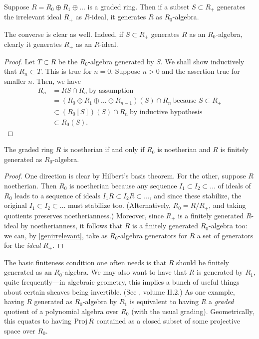 \begin{proposition} \label{genirrelevant}
Suppose $R = R_0 \oplus R_1 \oplus \dots$ is  a graded ring. Then if a subset
$S \subset R_+$ generates the irrelevant ideal $R_+$ as $R$-ideal, it generates $R$ as $R_0$-algebra.
\end{proposition} 
The converse is clear as well. 
Indeed, if $S \subset R_+$ generates $R$ as an $R_0$-algebra, clearly it
generates $R_+$ as an $R$-ideal. 
\begin{proof} 
Let $T \subset R$ be the $R_0$-algebra generated by $S$. We shall show
inductively that $R_n \subset T$. This is true for $n=0$. Suppose $n>0$ and the
assertion true for smaller $n$. Then, we have
\begin{align*}
R_n  & = RS \cap R_n   \ \text{by assumption} \\
& = (R_0 \oplus R_1 \oplus \dots \oplus R_{n-1})(S) \cap R_n \ \text{because $S
\subset R_+$} \\
& \subset (R_0[S]) (S) \cap R_n \ \text{by inductive hypothesis} \\
& \subset R_0(S). \end{align*}
\end{proof} 
\begin{theorem} \label{gradednoetherian}
The graded ring $R$ is noetherian if and only if $R_0$ is noetherian and $R$ is finitely
generated as $R_0$-algebra.
\end{theorem} 
\begin{proof} 
One direction is clear by Hilbert's basis theorem. For the other, suppose $R$
noetherian. Then $R_0$ is noetherian because any sequence $I_1 \subset I_2
\subset \dots$ of ideals of $R_0$ leads to a sequence of ideals $I_1 R \subset
I_2 R \subset \dots$, and since these stabilize, the original $I_1 \subset I_2
\subset \dots$ must stabilize too. (Alternatively, $R_0 = R/R_+$, and taking
quotients preserves noetherianness.)
Moreover, since $R_+$ is a finitely generated
$R$-ideal by noetherianness, it follows that $R$ is a finitely generated
$R_0$-algebra too: we can, by \cref{genirrelevant}, take as $R_0$-algebra
generators for $R$ a set of generators for the \emph{ideal} $R_+$.
\end{proof} 

The basic finiteness condition one often needs is that $R$ should be finitely generated as an
$R_0$-algebra. We may also want to have that $R$ is generated by $R_1$, quite
frequently---in algebraic geometry, this implies a bunch of useful things about certain sheaves
being invertible. (See \cite{EGA}, volume II.2.)
As one example, having $R$ generated as $R_0$-algebra by $R_1$ is equivalent to
having $R$ a \emph{graded} quotient of a polynomial algebra over $R_0$ (with
the usual grading).
Geometrically, this equates to having $\operatorname{Proj} R$ contained as a closed subset of
some projective space over $R_0$.


